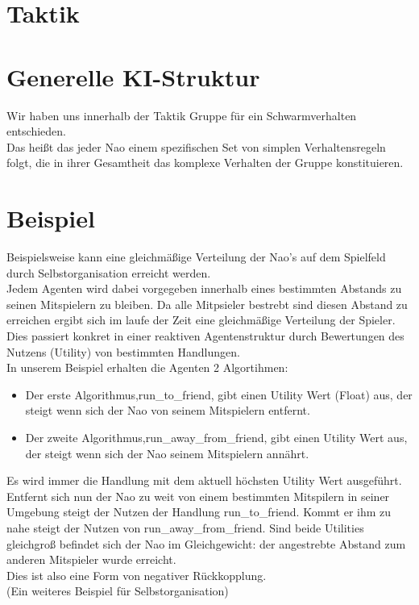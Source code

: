 \section{Taktik}
\section{Generelle KI-Struktur}
Wir haben uns innerhalb der Taktik Gruppe für ein Schwarmverhalten entschieden.\\
Das heißt das jeder Nao einem spezifischen Set von simplen 
Verhaltensregeln folgt, die in ihrer Gesamtheit das komplexe Verhalten 
der Gruppe konstituieren.

\section{Beispiel}
Beispielsweise kann eine gleichmäßige Verteilung der Nao's auf dem Spielfeld durch Selbstorganisation
erreicht werden.\\
Jedem Agenten wird dabei vorgegeben innerhalb eines bestimmten 
Abstands zu seinen Mitspielern zu bleiben. Da alle Mitpsieler bestrebt 
sind diesen Abstand zu erreichen ergibt sich im laufe der Zeit eine 
gleichmäßige Verteilung der Spieler.\\
Dies passiert konkret in einer reaktiven Agentenstruktur durch Bewertungen des Nutzens (Utility) von bestimmten Handlungen.\\
In unserem Beispiel erhalten die Agenten 2 Algortihmen:

\begin{itemize}
\item Der erste Algorithmus,run\_to\_friend, gibt einen Utility Wert 
(Float) aus, der steigt wenn sich der Nao von seinem Mitspielern 
entfernt.
\item Der zweite Algorithmus,run\_away\_from\_friend, gibt einen Utility
 Wert aus, der steigt wenn sich der Nao seinem Mitspielern annährt.
\end{itemize}
Es wird immer die Handlung mit dem aktuell höchsten Utility Wert ausgeführt.\\
Entfernt sich nun der Nao zu weit von einem bestimmten Mitspilern
 in seiner Umgebung steigt der Nutzen der Handlung run\_to\_friend. 
Kommt er ihm zu nahe steigt der Nutzen von run\_away\_from\_friend.
Sind beide Utilities gleichgroß befindet sich der Nao im Gleichgewicht: 
der angestrebte Abstand zum anderen Mitspieler wurde erreicht.\\
Dies ist also eine Form von negativer Rückkopplung.\\
(Ein weiteres Beispiel für Selbstorganisation)

